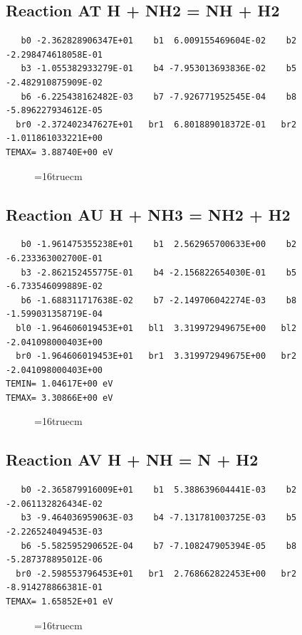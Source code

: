 \documentclass[12pt,dvipdfm]{article}
\begin{document}
\subsection{
Reaction AT H + NH2 = NH + H2}
\begin{small}\begin{verbatim}
   b0 -2.362828906347E+01    b1  6.009155469604E-02    b2 -2.298474618058E-01
   b3 -1.055382933279E-01    b4 -7.953013693836E-02    b5 -2.482910875909E-02
   b6 -6.225438162482E-03    b7 -7.926771952545E-04    b8 -5.896227934612E-05
  br0 -2.372402347627E+01   br1  6.801889018372E-01   br2 -1.011861033221E+00
TEMAX= 3.88740E+00 eV
   \end{verbatim}\end{small}
\begin{figure}[h!]
\label{n2rates}
\epsfxsize=16truecm
\end{figure}
\newpage

\subsection{
Reaction AU H + NH3 = NH2 + H2}
\begin{small}\begin{verbatim}
   b0 -1.961475355238E+01    b1  2.562965700633E+00    b2 -6.233363002700E-01
   b3 -2.862152455775E-01    b4 -2.156822654030E-01    b5 -6.733546099889E-02
   b6 -1.688311717638E-02    b7 -2.149706042274E-03    b8 -1.599031358719E-04
  bl0 -1.964606019453E+01   bl1  3.319972949675E+00   bl2 -2.041098000403E+00
  br0 -1.964606019453E+01   br1  3.319972949675E+00   br2 -2.041098000403E+00
TEMIN= 1.04617E+00 eV
TEMAX= 3.30866E+00 eV
   \end{verbatim}\end{small}
\begin{figure}[h!]
\label{n2rates}
\epsfxsize=16truecm
\end{figure}
\newpage

\subsection{
Reaction AV H + NH = N + H2}
\begin{small}\begin{verbatim}
   b0 -2.365879916009E+01    b1  5.388639604441E-03    b2 -2.061132826434E-02
   b3 -9.464036959063E-03    b4 -7.131781003725E-03    b5 -2.226524049453E-03
   b6 -5.582595290652E-04    b7 -7.108247905394E-05    b8 -5.287378895012E-06
  br0 -2.598553796453E+01   br1  2.768662822453E+00   br2 -8.914278866381E-01
TEMAX= 1.65852E+01 eV
   \end{verbatim}\end{small}
\begin{figure}[h!]
\label{n2rates}
\epsfxsize=16truecm
\end{figure}
\newpage
\end{document}
